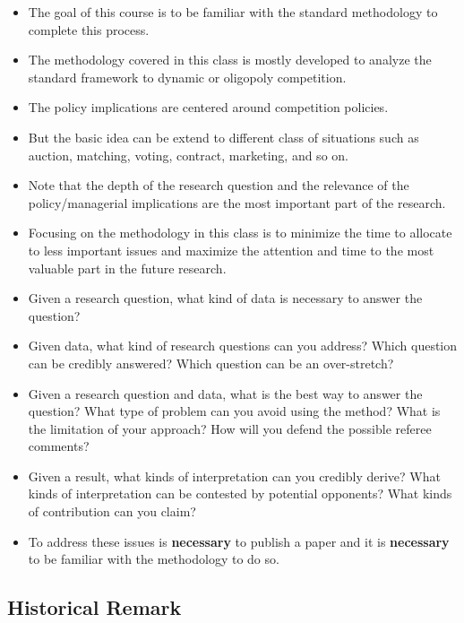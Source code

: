 \documentclass[
]{book}
\providecommand{\tightlist}{%
  \setlength{\itemsep}{0pt}\setlength{\parskip}{0pt}}
\begin{document}
\begin{itemize}
\tightlist
\item
  The goal of this course is to be familiar with the standard methodology to complete this process.
\item
  The methodology covered in this class is mostly developed to analyze the standard framework to dynamic or oligopoly competition.
\item
  The policy implications are centered around competition policies.
\item
  But the basic idea can be extend to different class of situations such as auction, matching, voting, contract, marketing, and so on.
\item
  Note that the depth of the research question and the relevance of the policy/managerial implications are the most important part of the research.
\item
  Focusing on the methodology in this class is to minimize the time to allocate to less important issues and maximize the attention and time to the most valuable part in the future research.
\item
  Given a research question, what kind of data is necessary to answer the question?
\item
  Given data, what kind of research questions can you address? Which question can be credibly answered? Which question can be an over-stretch?
\item
  Given a research question and data, what is the best way to answer the question? What type of problem can you avoid using the method? What is the limitation of your approach? How will you defend the possible referee comments?
\item
  Given a result, what kinds of interpretation can you credibly derive? What kinds of interpretation can be contested by potential opponents? What kinds of contribution can you claim?
\item
  To address these issues is \textbf{necessary} to publish a paper and it is \textbf{necessary} to be familiar with the methodology to do so.
\end{itemize}

\hypertarget{historical-remark}{%
\subsection{Historical Remark}\label{historical-remark}}
\end{document}
